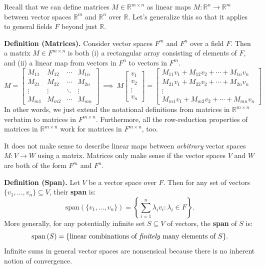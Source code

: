 Recall that we can define matrices $M \in \mathbb{R}^{m \times n}$ as linear maps $M: \mathbb{R}^n \to \mathbb{R}^m$ between vector spaces $\mathbb{R}^m$ and $\mathbb{R}^n$ over $\mathbb{R}$.  Let's generalize this so that it applies to general fields $F$ beyond just $\mathbb{R}$.

\textbf{Definition (Matrices).} Consider vector spaces $F^m$ and $F^n$ over a field $F$.  Then a matrix $M \in F^{m \times n}$ is both (i) a rectangular array consisting of elements of $F$, and (ii) a linear map from vectors in $F^n$ to vectors in $F^m$.
\[ M = \begin{bmatrix} M_{11} & M_{12} & \cdots & M_{1n} \\ M_{21} & M_{22} & \cdots & M_{2n} \\ \vdots & \vdots & \ddots & \vdots \\ M_{m1} & M_{m2} & \cdots & M_{mn} \end{bmatrix} ~ \implies ~ M\begin{bmatrix} v_1 \\ v_2 \\ \vdots \\ v_n \end{bmatrix} = \begin{bmatrix} M_{11}v_1 + M_{12}v_2 + \cdots + M_{1n}v_n \\ M_{21} v_1 + M_{22} v_2 + \cdots + M_{2n} v_n \\ \vdots \\ M_{m1} v_1 + M_{m2}v_2 + \cdots + M_{mn} v_n \end{bmatrix} \]
In other words, we just extend the notational definitions from matrices in $\mathbb{R}^{m \times n}$ verbatim to matrices in $F^{m \times n}$.  Furthermore, all the row-reduction properties of matrices in $\mathbb{R}^{m \times n}$ work for matrices in $F^{m \times n}$, too.

\begin{remark}
    It does not make sense to describe linear maps between \emph{arbitrary} vector spaces $M: V \to W$ using a matrix.  Matrices only make sense if the vector spaces $V$ and $W$ are both of the form $F^m$ and $F^n$.
\end{remark}

\textbf{Definition (Span).} Let $V$ be a vector space over $F$.  Then for any set of vectors $\{v_1, \dots, v_n\} \subseteq V$, their \textbf{span} is:
\[ \mathrm{span}\left(\{v_1, \dots, v_n\}\right) = \left \{ \sum_{i = 1}^n \lambda_i v_i: \lambda_i \in F \right \}. \]
More generally, for any potentially infinite set $S \subseteq V$ of vectors, the \textbf{span} of $S$ is:
\[ \mathrm{span}\left(S\right) = \{\text{linear combinations of \emph{finitely} many elements of } S\}. \]
Infinite sums in general vector spaces are nonsensical because there is no inherent notion of convergence.


